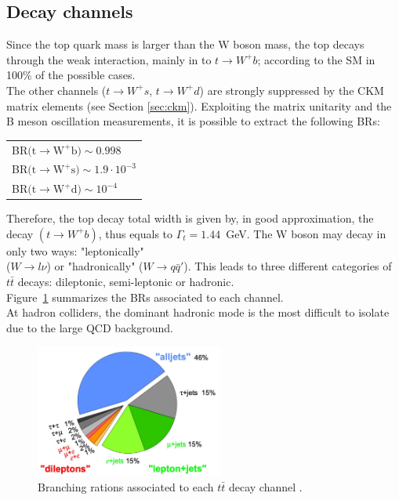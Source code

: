 \subsection{Decay channels}
Since the top quark mass is larger than the W boson mass, the top decays through the weak interaction, mainly in to $t\rightarrow W^{+}b$; according to the SM in 100\% of the possible cases.\\
The other channels ($t\rightarrow W^{+}s$, $t\rightarrow W^{+}d$) are strongly suppressed by the CKM matrix elements (see Section \ref{sec:ckm}). Exploiting the matrix unitarity 
and the B meson oscillation measurements, it is possible to extract the following BRs\cite{tdecayBR}:
\begin{table}[!ht]
	\centering
	\begin{tabular}{l}
		BR$(\mathrm{t \rightarrow W^{+} b)\sim 0.998}$\\
		BR$(\mathrm{t \rightarrow W^{+} s)\sim 1.9\cdot10^{-3}}$\\
		BR$(\mathrm{t \rightarrow W^{+} d)\sim 10^{-4}}$\\
	\end{tabular}
\end{table}
\newline Therefore, the top decay total width is given by, in good approximation, the decay $(t \rightarrow W^{+} b)$, thus equals to $\Gamma_t = 1.44$~GeV.
The W boson may decay in only two ways: "leptonically" \\($W\rightarrow l\nu$) or "hadronically" ($W\rightarrow q\bar{q}'$). This leads to three different categories
of $t\bar{t}$ decays: dileptonic, semi-leptonic or hadronic.\\ Figure~\ref{fig:ttBR} summarizes the BRs associated to each channel.\\
At hadron colliders, the dominant hadronic mode is the most difficult to isolate due to the large QCD background.
\begin{figure}[!h]
	\centering
	\includegraphics[width=0.55\textwidth]{Chapters/CH1/figures/ttBR}
	\caption{Branching rations associated to each $t\bar{t}$ decay channel \cite{ttdecayBR}.}
	\label{fig:ttBR}
\end{figure}

